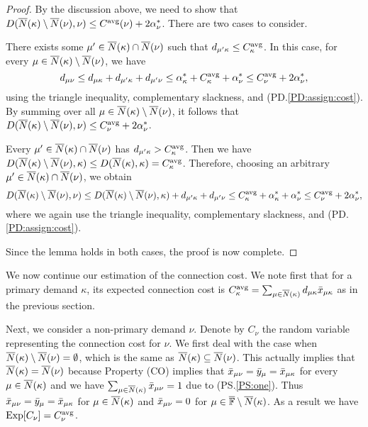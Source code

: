 \documentclass{llncs}
\begin{document}
\begin{proof}
  By the discussion above, we need to show that $D({\overline{N}}(\kappa)
  \setminus {\overline{N}}(\nu), \nu) \leq C^{{\mbox{\scriptsize\rm avg}}}(\nu) +
  2\alpha_{\nu}^\ast$. There are two cases to consider.

\begin{description}
%	
\item{}
	 There exists some $\mu'\in {\overline{N}}(\kappa) \cap
  {\overline{N}}(\nu)$ such that $d_{\mu' \kappa} \leq C^{{\mbox{\scriptsize\rm avg}}}_\kappa$.
In this case, for every $\mu\in {\overline{N}}(\kappa)\setminus {\overline{N}}(\nu)$, we have
%
\begin{equation*}
d_{\mu \nu} \leq d_{\mu \kappa} + d_{\mu' \kappa} + d_{\mu' \nu}  
 	\le  \alpha^\ast_\kappa + C^{{\mbox{\scriptsize\rm avg}}}_\kappa + \alpha^\ast_{\nu}
  \leq C^{{\mbox{\scriptsize\rm avg}}}_\nu + 2\alpha_{\nu}^\ast,
\end{equation*}
%
using the triangle inequality, complementary slackness, and (PD.\ref{PD:assign:cost}).
By summing over all $\mu\in {\overline{N}}(\kappa) \setminus {\overline{N}}(\nu)$, it
follows that $D({\overline{N}}(\kappa) \setminus {\overline{N}}(\nu), \nu) \leq
C^{{\mbox{\scriptsize\rm avg}}}_\nu + 2\alpha_{\nu}^\ast$.

\item{}
 Every $\mu'\in {\overline{N}}(\kappa)\cap {\overline{N}}(\nu)$
has $d_{\mu'\kappa} > C^{{\mbox{\scriptsize\rm avg}}}_\kappa$. Then we
have $D({\overline{N}}(\kappa) \setminus {\overline{N}}(\nu),\kappa)\leq
D({\overline{N}}(\kappa),\kappa)=C^{{\mbox{\scriptsize\rm avg}}}_{\kappa}$. Therefore,
choosing an arbitrary $\mu'\in {\overline{N}}(\kappa)\cap {\overline{N}}(\nu)$,
we obtain
%
\begin{equation*}
  D({\overline{N}}(\kappa) \setminus {\overline{N}}(\nu), \nu) 
	\leq  D({\overline{N}}(\kappa) \setminus {\overline{N}}(\nu), \kappa) 
			+ d_{\mu' \kappa} + d_{\mu' \nu} 
	\leq  C^{{\mbox{\scriptsize\rm avg}}}_{\kappa} +
  \alpha_{\kappa}^\ast + \alpha_{\nu}^\ast
	\leq C^{{\mbox{\scriptsize\rm avg}}}_\nu + 2\alpha_{\nu}^\ast,
\end{equation*}
%
where we again use the triangle inequality,
complementary slackness, and  (PD.\ref{PD:assign:cost}).
%
\end{description}
%
Since the lemma holds in both cases, the proof is now complete.
\end{proof}

We now continue our estimation of the connection cost. We note first
that for a primary demand $\kappa$, its expected connection cost
is $C^{\mbox{\scriptsize\rm avg}}_{\kappa} = \sum_{\mu\in{\overline{N}}(\kappa)}
d_{\mu\kappa}{\bar x}_{\mu\kappa}$ as in the previous section.

Next, we consider a non-primary demand $\nu$.  Denote by $C_\nu$ the
random variable representing the connection cost for $\nu$. We first
deal with the case when ${\overline{N}}(\kappa)\setminus {\overline{N}}(\nu) =
\emptyset$, which is the same as ${\overline{N}}(\kappa) \subseteq
{\overline{N}}(\nu)$. This actually implies that ${\overline{N}}(\kappa) =
{\overline{N}}(\nu)$ because Property (CO) implies that ${\bar x}_{\mu\nu} =
{\bar y}_{\mu} = {\bar x}_{\mu\kappa}$ for every $\mu \in {\overline{N}}(\kappa)$
and we have $\sum_{\mu\in{\overline{N}}(\kappa)} {\bar x}_{\mu\nu} = 1$ due to
(PS.\ref{PS:one}). Thus ${\bar x}_{\mu\nu} = {\bar y}_{\mu} =
{\bar x}_{\mu\kappa}$ for $\mu \in {\overline{N}}(\kappa)$ and ${\bar x}_{\mu\nu} =
0$ for $\mu\in \overline{\mathbb{F}} \setminus {\overline{N}}(\kappa)$. As a result we
have $\mbox{\rm Exp}[C_{\nu}] = C^{{\mbox{\scriptsize\rm avg}}}_{\nu}$.
\end{document}
